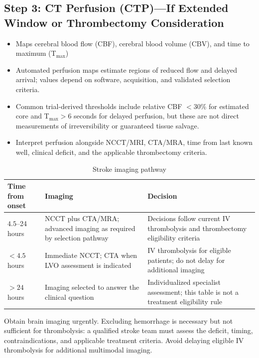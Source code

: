 \subsection{Step 3: CT Perfusion (CTP)---If Extended Window or Thrombectomy Consideration}
\begin{itemize}
    \item Maps cerebral blood flow (CBF), cerebral blood volume (CBV), and time to maximum (T$_{\text{max}}$)
    \item Automated perfusion maps estimate regions of reduced flow and delayed arrival; values depend on software, acquisition, and validated selection criteria.
    \item Common trial-derived thresholds include relative CBF $<30\%$ for estimated core and T$_{\max}>6$ seconds for delayed perfusion, but these are not direct measurements of irreversibility or guaranteed tissue salvage.
    \item Interpret perfusion alongside NCCT/MRI, CTA/MRA, time from last known well, clinical deficit, and the applicable thrombectomy criteria.
\end{itemize}

\begin{table}[h]
\centering
\caption{Stroke imaging pathway}
\begin{tabular}{|p{}|p{}|p{}|}
\hline
\textbf{Time from onset} & \textbf{Imaging} & \textbf{Decision} \\
\hline
$4.5$--24 hours & NCCT plus CTA/MRA; advanced imaging as required by selection pathway & Decisions follow current IV thrombolysis and thrombectomy eligibility criteria \\
\hline
$<4.5$ hours & Immediate NCCT; CTA when LVO assessment is indicated & IV thrombolysis for eligible patients; do not delay for additional imaging \\
\hline
$>24$ hours & Imaging selected to answer the clinical question & Individualized specialist assessment; this table is not a treatment eligibility rule \\
\hline
\end{tabular}
\end{table}

\begin{pearlbox}
Obtain brain imaging urgently. Excluding hemorrhage is necessary but not sufficient for thrombolysis: a qualified stroke team must assess the deficit, timing, contraindications, and applicable treatment criteria. Avoid delaying eligible IV thrombolysis for additional multimodal imaging.
\end{pearlbox}

